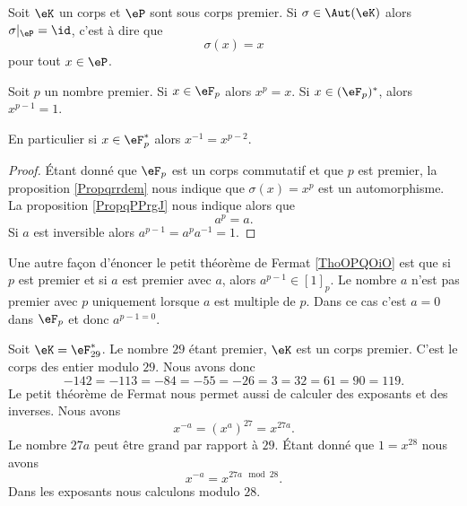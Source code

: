 \begin{proposition}     \label{PropqPPrgJ}
    Soit \( \eK\) un corps et \( \eP\) sont sous corps premier. Si \( \sigma\in\Aut(\eK)\) alors \( \sigma|_{\eP}=\id\), c'est à dire que
    \begin{equation}
        \sigma(x)=x
    \end{equation}
    pour tout \( x\in \eP\).
\end{proposition}

\begin{theorem}       \label{ThoOPQOiO}   
    Soit \( p\) un nombre premier. Si \( x\in \eF_p\) alors \( x^p=x\). Si \( x\in(\eF_p)^*\), alors \( x^{p-1}=1\).

    En particulier si \( x\in \eF_p^*\) alors \( x^{-1}=x^{p-2}\).
\end{theorem}

\begin{proof}
    Étant donné que \( \eF_p\) est un corps commutatif et que \( p\) est premier, la proposition \ref{Propqrrdem} nous indique que \( \sigma(x)=x^p\) est un automorphisme. La proposition \ref{PropqPPrgJ} nous indique alors que
    \begin{equation}
        a^p=a.
    \end{equation}
    Si \( a\) est inversible alors \( a^{p-1}=a^pa^{-1}=1\).
\end{proof}

\begin{remark}      \label{RemCoSnxh}
    Une autre façon d'énoncer le petit théorème de Fermat \ref{ThoOPQOiO} est que si \( p\) est premier et si \( a\) est premier avec \( a\), alors \( a^{p-1}\in[1]_p\). Le nombre \( a\) n'est pas premier avec \( p\) uniquement lorsque \( a\) est multiple de \( p\). Dans ce cas c'est \( a=0\) dans \( \eF_p\) et donc \( a^{p-1=0}\).
\end{remark}

\begin{example}
    Soit \( \eK=\eF_{29}^*\). Le nombre \( 29\) étant premier, \( \eK\) est un corps premier. C'est le corps des entier modulo \( 29\). Nous avons donc
    \begin{equation}
            -142=-113=-84=-55=-26=3=32=61=90=119.
    \end{equation}
    Le petit théorème de Fermat nous permet aussi de calculer des exposants et des inverses. Nous avons
    \begin{equation}
        x^{-a}=(x^a)^{27}=x^{27a}.
    \end{equation}
    Le nombre \( 27 a\) peut être grand par rapport à \( 29\). Étant donné que \( 1=x^{28}\) nous avons
    \begin{equation}
        x^{-a}=x^{27 a\mod 28}.
    \end{equation}
    Dans les exposants nous calculons modulo \( 28\).
\end{example}




